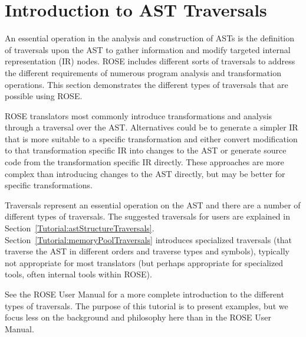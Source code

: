 \chapter{Introduction to AST Traversals}
\label{chap:traversals}


    An essential operation in the analysis and construction of ASTs is the
definition of traversals upon the AST to gather information and modify
targeted internal representation (IR) nodes.  ROSE includes different
sorts of traversals to address the different requirements of numerous
program analysis and transformation operations.  This section demonstrates
the different types of traversals that are possible using ROSE.

    ROSE translators most commonly introduce transformations and analysis
through a traversal over the AST.  Alternatives could be to generate
a simpler IR that is more suitable to a specific transformation and
either convert modification to that transformation specific IR
into changes to the AST or generate source code from the transformation specific
IR directly.  These approaches are more complex than introducing changes
to the AST directly, but may be better for specific transformations.

   Traversals represent an essential operation on the AST and there are a
number of different types of traversals.  The suggested traversals for users
are explained in Section~\ref{Tutorial:astStructureTraversals}.
Section~\ref{Tutorial:memoryPoolTraversals} introduces specialized traversals
(that traverse the AST in different orders and traverse types and symbols),
typically not appropriate for most translators (but perhaps appropriate for
specialized tools, often internal tools within ROSE).

See the ROSE User Manual for a more complete introduction to the different types of
traversals.  The purpose of this tutorial is to present examples, but we focus less on
the background and philosophy here than in the ROSE User Manual.


